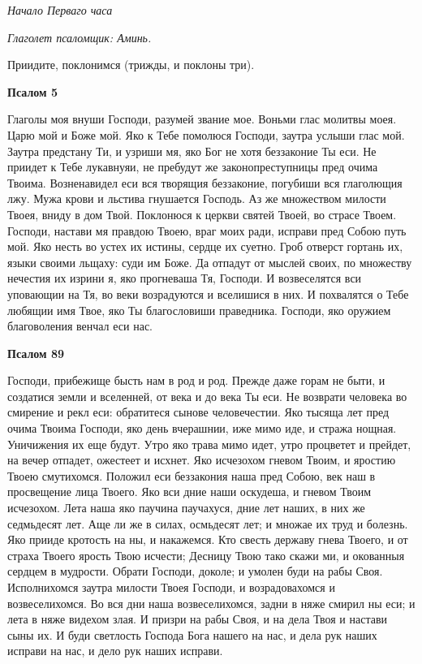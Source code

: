 \itshape Начало Перваго часа\normalfont{}


\itshape Глаголет псаломщик:\normalfont{} Аминь.


Приидите, поклонимся (трижды, и поклоны три).





\bfseries Псалом 5\normalfont{}


Глаголы моя внуши Господи, разумей звание мое. Воньми глас молитвы моея. Царю мой и Боже мой. Яко к Тебе помолюся Господи, заутра услыши глас мой. Заутра предстану Ти, и узриши мя, яко Бог не хотя беззаконие Ты еси. Не приидет к Тебе лукавнуяи, не пребудут же законопреступницы пред очима Твоима. Возненавидел еси вся творящия беззаконие, погубиши вся глаголющия лжу. Мужа крови и льстива гнушается Господь. Аз же множеством милости Твоея, вниду в дом Твой. Поклонюся к церкви святей Твоей, во страсе Твоем. Господи, настави мя правдою Твоею, враг моих ради, исправи пред Собою путь мой. Яко несть во устех их истины, сердце их суетно. Гроб отверст гортань их, языки своими льщаху: суди им Боже. Да отпадут от мыслей своих, по множеству нечестия их изрини я, яко прогневаша Тя, Господи. И возвеселятся вси уповающии на Тя, во веки возрадуются и вселишися в них. И похвалятся о Тебе любящии имя Твое, яко Ты благословиши праведника. Господи, яко оружием благоволения венчал еси нас.





\bfseries Псалом 89\normalfont{}


Господи, прибежище бысть нам в род и род. Прежде даже горам не быти, и создатися земли и вселенней, от века и до века Ты еси. Не возврати человека во смирение и рекл еси: обратитеся сынове человечестии. Яко тысяща лет пред очима Твоима Господи, яко день вчерашнии, иже мимо иде, и стража нощная. Уничижения их еще будут. Утро яко трава мимо идет, утро процветет и прейдет, на вечер отпадет, ожестеет и исхнет. Яко исчезохом гневом Твоим, и яростию Твоею смутихомся. Положил еси беззакония наша пред Собою, век наш в просвещение лица Твоего. Яко вси дние наши оскудеша, и гневом Твоим исчезохом. Лета наша яко паучина паучахуся, дние лет наших, в них же седмьдесят лет. Аще ли же в силах, осмьдесят лет; и множае их труд и болезнь. Яко прииде кротость на ны, и накажемся. Кто свесть державу гнева Твоего, и от страха Твоего ярость Твою исчести; Десницу Твою тако скажи ми, и окованныя сердцем в мудрости. Обрати Господи, доколе; и умолен буди на рабы Своя. Исполнихомся заутра милости Твоея Господи, и возрадовахомся и возвеселихомся. Во вся дни наша возвеселихомся, задни в няже смирил ны еси; и лета в няже видехом злая. И призри на рабы Своя, и на дела Твоя и настави сыны их. И буди светлость Господа Бога нашего на нас, и дела рук наших исправи на нас, и дело рук наших исправи.





